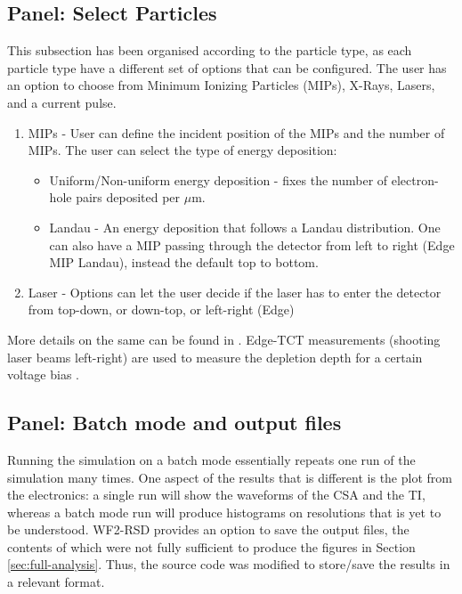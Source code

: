 \documentclass[11pt]{article}
\begin{document}
\subsection{Panel: Select Particles}
This subsection has been organised according to the particle type, as each particle type have a different set of options that can be configured. The user has an option to choose from Minimum Ionizing Particles (MIPs), X-Rays, Lasers, and a current pulse.
\begin{enumerate}
    \item MIPs - User can define the incident position of the MIPs and the number of MIPs. The user can select the type of energy deposition:
    \begin{itemize}
        \item Uniform/Non-uniform energy deposition - fixes the number of electron-hole pairs deposited per $\mu$m.
        \item Landau - An energy deposition that follows a Landau distribution. One can also have a MIP passing through the detector from left to right (Edge MIP Landau), instead the default top to bottom.
    \end{itemize}
    \item Laser - Options can let the user decide if the laser has to enter the detector from top-down, or down-top, or left-right (Edge)
\end{enumerate}
More details on the same can be found in \cite{WF2-incident-particles-cenna}.
\newline
Edge-TCT measurements (shooting laser beams left-right) are used to measure the depletion depth for a certain voltage bias \cite{moll-acceptor-removal}.

\subsection{Panel: Batch mode and output files}
Running the simulation on a batch mode essentially repeats one run of the simulation many times. One aspect of the results that is different is the plot from the electronics: a single run will show the waveforms of the CSA and the TI, whereas a batch mode run will produce histograms on resolutions that is yet to be understood.
\newline
WF2-RSD provides an option to save the output files, the contents of which were not fully sufficient to produce the figures in Section \ref{sec:full-analysis}. Thus, the source code was modified to store/save the results in a relevant format.
\end{document}
